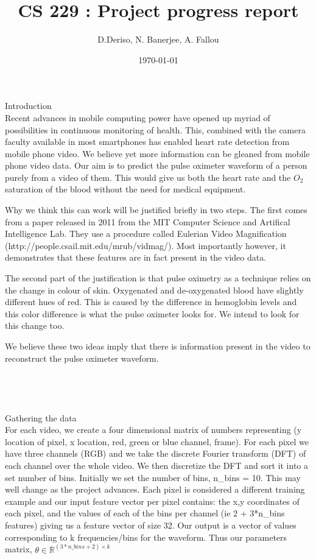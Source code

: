 \documentclass[12pt]{article}
\begin{document}
  \title{CS 229 : Project progress report}
  \author{D.Deriso, N. Banerjee, A. Fallou}
  \date{\today}
  \maketitle
  \thispagestyle{empty}

\large Introduction \\
%
\small Recent advances in mobile computing power have opened up myriad of possibilities in continuous monitoring of health. 
This, combined with the camera faculty available in most smartphones has enabled heart rate detection from mobile phone video. 
We believe yet more information can be gleaned from mobile phone video data. 
Our aim is to predict the pulse oximeter waveform of a person purely from a video of them. 
This would give us both the heart rate and the $O_2$ saturation of the blood without the need for medical equipment.

Why we think this can work will be justified briefly in two steps. 
The first comes from a paper released in 2011 from the MIT Computer Science and Artifical Intelligence Lab. 
They use a procedure called Eulerian Video Magnification (http://people.csail.mit.edu/mrub/vidmag/).  
Most importantly however, it demonstrates that these features are in fact present in the video data.

The second part of the justification is that pulse oximetry as a technique relies on the change in colour of skin. 
Oxygenated and de-oxygenated blood have slightly different hues of red.
This is caused by the difference in hemoglobin levels and this color difference is what the pulse oximeter looks for. 
We intend to look for this change too.

We believe these two ideas imply that there is information present in the video to reconstruct the pulse oximeter waveform.\\
\\
\\
\\ %
\\
\large Gathering the data \\
\small For each video, we create a four dimensional matrix of numbers representing (y location of pixel, x location, red, green or blue channel, frame).
For each pixel we have three channels (RGB) and we take the discrete Fourier transform (DFT) of each channel over the whole video.
We then discretize the DFT and sort it into a set number of bins. 
Initially we set the number of bins, n\_bins = 10.
This may well change as the project advances.
Each pixel is considered a different training example and our input feature vector per pixel contains: 
the x,y coordinates of each pixel, and the values of each of the bins per channel (ie 2 + 3*n\_bins features)
giving us a feature vector of size 32.
Our output is a vector of values corresponding to k frequencies/bins for the waveform.
Thus our parameters matrix, $\theta \in \mathbb{R}^{(3*n\_bins + 2) \times k}$
\end{document}
